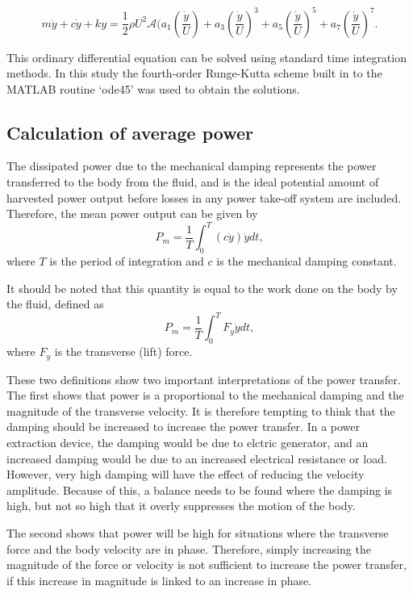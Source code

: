\begin{equation}
\label{final_equation_motion}
m\ddot{y}{+}c\dot{y}{+}ky{=}\frac{1}{2}\rho U^2 \mathcal {A} \Bigg(a_1\left(\frac{\dot{y}}{U}\right){+}a_3\left(\frac{\dot{y}}{U}\right)^3{+}a_5\left(\frac{\dot{y}}{U}\right)^5{+}a_7\left(\frac{\dot{y}}{U}\right)^7.
\end{equation}

This ordinary differential equation can be solved using standard time integration methods. In this study the fourth-order Runge-Kutta scheme built in to the MATLAB routine `ode45' was used to obtain the solutions. 

\subsection{Calculation of average power}

 The dissipated power due to the mechanical damping represents the power transferred to the body from the fluid, and is the ideal potential amount of harvested power output before losses in any power take-off system are included. Therefore, the mean power output can be given by
\begin{equation}
\label{power}
P_{m}=\frac{1}{T}\int_{0}^{T}(c\dot{y})\dot{y} dt,
\end{equation}
where $T$ is the period of integration and $c$ is the mechanical damping constant. 

It should be noted that this quantity is equal to the work done on the body by the fluid, defined as
\begin{equation}
\label{power_alt}
P_{m}=\frac{1}{T}\int_{0}^{T}F_y\dot{y} dt,
\end{equation}
where $F_y$ is the transverse (lift) force.

These two definitions show two important interpretations of the power transfer. The first shows that power is a proportional to the mechanical damping and the magnitude of the transverse velocity. It is therefore tempting to think that the damping should be increased to increase the power transfer. In a power extraction device, the damping would be due to elctric generator, and an increased damping would be due to an increased electrical resistance or load. However, very high damping will have the effect of reducing the velocity amplitude. Because of this, a balance needs to be found where the damping is high, but not so high that it overly suppresses the motion of the body.

The second shows that power will be high for situations where the transverse force and the body velocity are in phase. Therefore, simply increasing the magnitude of the force or velocity is not sufficient to increase the power transfer, if this increase in magnitude is linked to an increase in phase.
 
